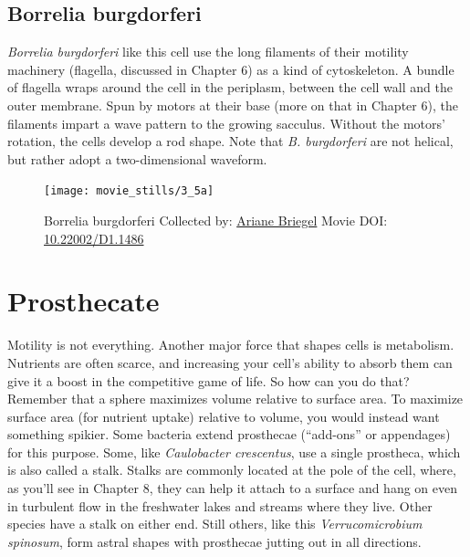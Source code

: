 \documentclass[]{tufte-book}
\begin{document}
\hypertarget{Borrelia_burgdorferi}{\subsection{Borrelia
burgdorferi}\label{Borrelia_burgdorferi}}

\emph{Borrelia burgdorferi} like this cell use the long filaments of
their motility machinery (flagella, discussed in Chapter 6) as a kind of
cytoskeleton. A bundle of flagella wraps around the cell in the
periplasm, between the cell wall and the outer membrane. Spun by motors
at their base (more on that in Chapter 6), the filaments impart a wave
pattern to the growing sacculus. Without the motors' rotation, the cells
develop a rod shape. Note that \emph{B. burgdorferi} are not helical,
but rather adopt a two-dimensional waveform.





\begin{figure}
\texttt{[image: movie\_stills/3\_5a]} \caption[Borrelia burgdorferi Collected by:
\protect\hyperlink{ariane_briegel}{Ariane Briegel} Movie DOI:
\href{https://doi.org/10.22002/D1.1486}{10.22002/D1.1486}]{Borrelia burgdorferi Collected by:
\protect\hyperlink{ariane_briegel}{Ariane Briegel} Movie DOI:
\href{https://doi.org/10.22002/D1.1486}{10.22002/D1.1486}}\label{fig:3-5a}
\end{figure}

\section{Prosthecate}\label{prosthecate}

Motility is not everything. Another major force that shapes cells is
metabolism. Nutrients are often scarce, and increasing your cell's
ability to absorb them can give it a boost in the competitive game of
life. So how can you do that? Remember that a sphere maximizes volume
relative to surface area. To maximize surface area (for nutrient uptake)
relative to volume, you would instead want something spikier. Some
bacteria extend prosthecae (``add-ons'' or appendages) for this purpose.
Some, like \emph{Caulobacter crescentus}, use a single prostheca, which
is also called a stalk. Stalks are commonly located at the pole of the
cell, where, as you'll see in Chapter 8, they can help it attach to a
surface and hang on even in turbulent flow in the freshwater lakes and
streams where they live. Other species have a stalk on either end. Still
others, like this \emph{Verrucomicrobium spinosum}, form astral shapes
with prosthecae jutting out in all directions.
\end{document}
